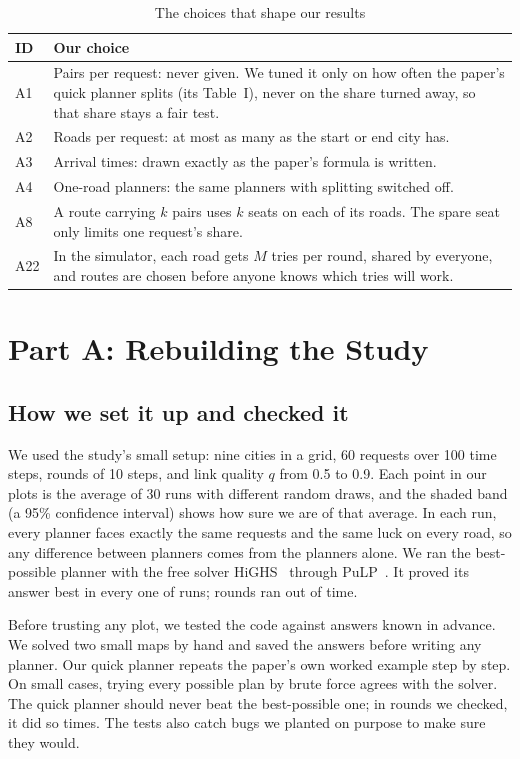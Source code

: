 \documentclass[conference]{IEEEtran}
\begin{document}
\begin{table}[t]
\caption{The choices that shape our results}
\label{tab:assumptions}
\centering\small
\begin{tabular}{@{}lp{}@{}}
\toprule
ID & Our choice \\
\midrule
A1 & Pairs per request: never given. We tuned it only on how often the paper's quick planner splits (its Table~I), never on the share turned away, so that share stays a fair test. \\
A2 & Roads per request: at most as many as the start or end city has. \\
A3 & Arrival times: drawn exactly as the paper's formula is written. \\
A4 & One-road planners: the same planners with splitting switched off. \\
A8 & A route carrying $k$ pairs uses $k$ seats on each of its roads. The spare seat only limits one request's share. \\
A22 & In the simulator, each road gets $M$ tries per round, shared by everyone, and routes are chosen before anyone knows which tries will work. \\
\bottomrule
\end{tabular}
\end{table}

\section{Part A: Rebuilding the Study}
\subsection{How we set it up and checked it}
We used the study's small setup: nine cities in a grid, 60 requests over 100 time steps, rounds of 10 steps, and link quality $q$ from 0.5 to 0.9. Each point in our plots is the average of 30 runs with different random draws, and the shaded band (a 95\% confidence interval) shows how sure we are of that average. In each run, every planner faces exactly the same requests and the same luck on every road, so any difference between planners comes from the planners alone. We ran the best-possible planner with the free solver HiGHS~\cite{highs} through PuLP~\cite{pulp}. It proved its answer best in every one of \ilpRuns{} runs; \ilpTimeLimitWindows{} rounds ran out of time.

Before trusting any plot, we tested the code against answers known in advance. We solved two small maps by hand and saved the answers before writing any planner. Our quick planner repeats the paper's own worked example step by step. On small cases, trying every possible plan by brute force agrees with the solver. The quick planner should never beat the best-possible one; in \auditWindows{} rounds we checked, it did so \auditViolations{} times. The tests also catch bugs we planted on purpose to make sure they would.
\end{document}
